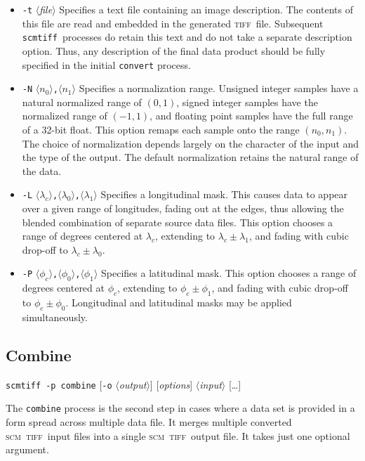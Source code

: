 \documentclass[oneside,10pt]{memoir}
\newcommand{\scm}     {\textsc{scm}}
\newcommand{\tiff}    {\textsc{tiff}}
\newcommand{\scmtiff} {\texttt{scmtiff}}
\newcommand{\inangles}[1]{$\langle$#1$\rangle$}
\newenvironment{optionlist}
  {\setlength{\leftmargini}{1in}\begin{itemize}}{\end{itemize}}
\begin{document}
\begin{Spacing}{1.1}
\begin{optionlist}
\item[\texttt{-t} \inangles{\textit{file}}] Specifies a text file containing an image description. The contents of this file are read and embedded in the generated \tiff\ file. Subsequent \scmtiff\ processes do retain this text and do not take a separate description option. Thus, any description of the final data product should be fully specified in the initial \texttt{convert} process.

\item[\texttt{-N} \inangles{$n_0$}\texttt{,}\inangles{$n_1$}] Specifies a normalization range. Unsigned integer samples have a natural normalized range of $(0, 1)$, signed integer samples have the normalized range of $(-1,1)$, and floating point samples have the full range of a 32-bit float. This option remaps each sample onto the range $(n_0,n_1)$. The choice of normalization depends largely on the character of the input and the type of the output. The default normalization retains the natural range of the data.

\item[\texttt{-L} \inangles{$\lambda_c$}\texttt{,}\inangles{$\lambda_0$}\texttt{,}\inangles{$\lambda_1$}] Specifies a longitudinal mask. This causes data to appear over a given range of longitudes, fading out at the edges, thus allowing the blended combination of separate source data files. This option chooses a range of degrees centered at $\lambda_c$, extending to $\lambda_c\pm\lambda_1$, and fading with cubic drop-off to $\lambda_c\pm\lambda_0$.

\item[\texttt{-P} \inangles{$\phi_c$}\texttt{,}\inangles{$\phi_0$}\texttt{,}\inangles{$\phi_1$}] Specifies a latitudinal mask. This option chooses a range of degrees centered at $\phi_c$, extending to $\phi_c\pm\phi_1$, and fading with cubic drop-off to $\phi_c\pm\phi_0$. Longitudinal and latitudinal masks may be applied simultaneously.
\end{optionlist}

\subsection{Combine}

\noindent\scmtiff\ \texttt{-p combine} [\texttt{-o} \inangles{\textit{output}}] [\textit{options}] \inangles{\textit{input}} [\ldots]

\bigskip The \texttt{combine} process is the second step in cases where a data set is provided in a form spread across multiple data file. It merges multiple converted \scm\ \tiff\ input files into a single \scm\ \tiff\ output file. It takes just one optional argument.


\end{Spacing}
\end{document}
